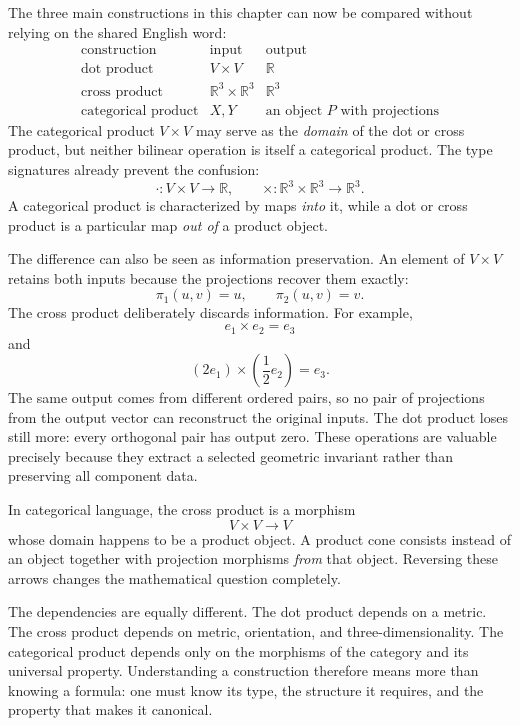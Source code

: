 The three main constructions in this chapter can now be compared without relying on the shared English word:
\[
  \begin{array}{c|c|c}
  \text{construction}&\text{input}&\text{output}\\ \hline
  \text{dot product}&V\times V&\mathbb R\\
  \text{cross product}&\mathbb R^3\times\mathbb R^3&\mathbb R^3\\
  \text{categorical product}&X,Y&\text{an object }P\text{ with projections}
  \end{array}
\]
The categorical product \(V\times V\) may serve as the \emph{domain} of the dot or cross product, but neither bilinear operation is itself a categorical product.  The type signatures already prevent the confusion:
\[
  \cdot:V\times V\to\mathbb R,
  \qquad
  \times:\mathbb R^3\times\mathbb R^3\to\mathbb R^3.
\]
A categorical product is characterized by maps \emph{into} it, while a dot or cross product is a particular map \emph{out of} a product object.

The difference can also be seen as information preservation.  An element of \(V\times V\) retains both inputs because the projections recover them exactly:
\[
  \pi_1(u,v)=u,
  \qquad
  \pi_2(u,v)=v.
\]
The cross product deliberately discards information.  For example,
\[
  e_1\times e_2=e_3
\]
and
\[
  (2e_1)\times\left(\frac12e_2\right)=e_3.
\]
The same output comes from different ordered pairs, so no pair of projections from the output vector can reconstruct the original inputs.  The dot product loses still more: every orthogonal pair has output zero.  These operations are valuable precisely because they extract a selected geometric invariant rather than preserving all component data.

In categorical language, the cross product is a morphism
\[
  V\times V\longrightarrow V
\]
whose domain happens to be a product object.  A product cone consists instead of an object together with projection morphisms \emph{from} that object.  Reversing these arrows changes the mathematical question completely.

The dependencies are equally different.  The dot product depends on a metric.  The cross product depends on metric, orientation, and three-dimensionality.  The categorical product depends only on the morphisms of the category and its universal property.  Understanding a construction therefore means more than knowing a formula: one must know its type, the structure it requires, and the property that makes it canonical.
